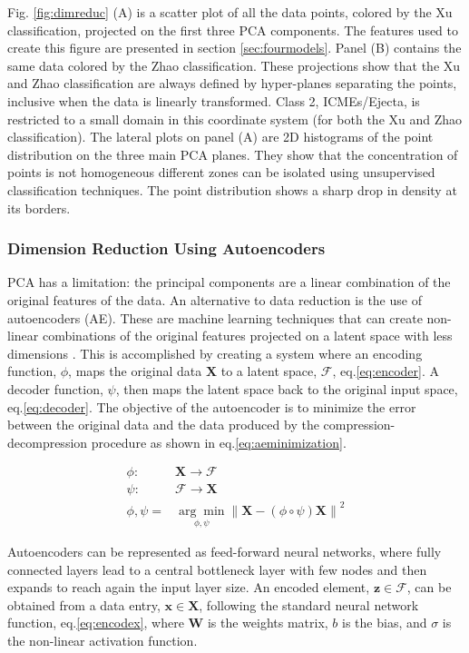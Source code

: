 Fig. \ref{fig:dimreduc} (A) is a scatter plot of all the data points, colored by the Xu classification, projected on the first three PCA components. The features used to create this figure are presented in section \ref{sec:fourmodels}. Panel (B) contains the same data colored by the Zhao classification. These projections show that the Xu and Zhao classification are always defined by hyper-planes separating the points, inclusive when the data is linearly transformed. Class 2, ICMEs/Ejecta, is restricted to a small domain in this coordinate system (for both the Xu and Zhao classification). The lateral plots on panel (A) are 2D histograms of the point distribution on the three main PCA planes. They show that the concentration of points is not homogeneous different zones can be isolated using unsupervised classification techniques. The point distribution shows a sharp drop in density at its borders.

\subsubsection{Dimension Reduction Using Autoencoders}
PCA has a limitation: the principal components are a linear combination of the original features of the data. An alternative to data reduction is the use of autoencoders (AE). These are machine learning techniques that can create non-linear combinations of the original features projected on a latent space with less dimensions \citep{Hinton2006}. This is accomplished by creating a system where an encoding function, $\phi$, maps the original data $\boldsymbol{X}$ to a latent space, $\boldsymbol{\mathcal{F}}$, eq.\eqref{eq:encoder}. A decoder function, $\psi$, then maps the latent space back to the original input space, eq.\eqref{eq:decoder}. The objective of the autoencoder is to minimize the error between the original data and the data produced by the compression-decompression procedure as shown in eq.\eqref{eq:aeminimization}.

\begin{align}
\phi: & \boldsymbol{X} \rightarrow \boldsymbol{\mathcal{F}} \label{eq:encoder}\\
\psi: & \boldsymbol{\mathcal{F}} \rightarrow \boldsymbol{X} \label{eq:decoder} \\
\phi,\psi = & \underset{\phi,\psi}{\arg \min} \left\lVert \boldsymbol{X} - (\phi \circ \psi) \boldsymbol{X} \right\rVert^2 \label{eq:aeminimization}
\end{align}

Autoencoders can be represented as feed-forward neural networks, where fully connected layers lead to a central bottleneck layer with few nodes and then expands to reach again the input layer size. An encoded element, $\boldsymbol{z} \in \boldsymbol{\mathcal{F}}$, can be obtained from a data entry, $\boldsymbol{x} \in \boldsymbol{X}$, following the standard neural network function, eq.\eqref{eq:encodex}, where $\boldsymbol{W}$ is the weights matrix, $b$ is the bias, and $\sigma$ is the non-linear activation function.

